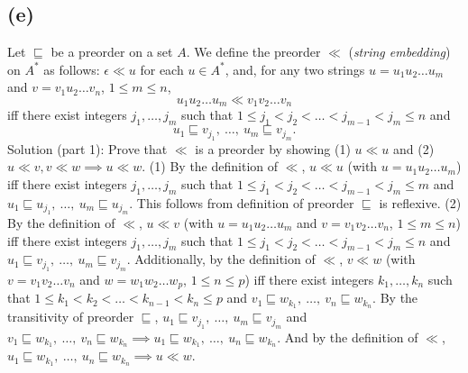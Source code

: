 \documentclass[12pt]{article}
\begin{document}
\subsection*{(e)}
Let $\sqsubseteq$ be a preorder on a set $A$. We define the
preorder $\ll$ ({\it string embedding\/}) on $A^{*}$ as follows:
\newline
$\epsilon \ll u$ for each $u\in A^{*}$, and,
for any two strings $u=u_{1}u_{2}\ldots u_{m}$ and
$v=v_{1}u_{2}\ldots v_{n}$, $1\leq m\leq n$,
$$u_{1}u_{2}\ldots u_{m} \ll v_{1}v_{2}\ldots v_{n}$$
iff there exist  integers $j_{1},\ldots,j_{m}$ such that
$1\leq j_{1} < j_{2} < \ldots < j_{m-1} < j_{m} \leq n$ and
$$u_{1} \sqsubseteq v_{j_{1}},\ \ldots,\ u_{m} \sqsubseteq v_{j_{m}}.$$
\newline
Solution (part 1): Prove that $\ll$ is a preorder by showing (1) $u \ll u$ and
(2) $u \ll v, v \ll w \implies u \ll w$.
\newline
(1) By the definition of $\ll$, $u \ll u$ (with $u=u_{1}u_{2}\ldots u_{m}$) iff
there exist integers $j_{1},\ldots,j_{m}$ such that
$1\leq j_{1} < j_{2} < \ldots < j_{m-1} < j_{m} \leq m$ and
$u_{1} \sqsubseteq u_{j_{1}},\ \ldots,\ u_{m} \sqsubseteq u_{j_{m}}$.
This follows from definition of preorder $\sqsubseteq$ is reflexive.
\newline
(2) By the definition of $\ll$, $u \ll v$ (with $u=u_{1}u_{2}\ldots u_{m}$ and
$v=v_{1}v_{2}\ldots v_{n}$, $1\leq m\leq n$)
iff there exist integers $j_{1},\ldots,j_{m}$ such that
$1\leq j_{1} < j_{2} < \ldots < j_{m-1} < j_{m} \leq n$ and
$u_{1} \sqsubseteq v_{j_{1}},\ \ldots,\ u_{m} \sqsubseteq v_{j_{m}}.$
\newline
Additionally, by the definition of $\ll$, $v \ll w$
(with $v=v_{1}v_{2}\ldots v_{n}$ and $w=w_{1}w_{2}\ldots w_{p}$,
$1\leq n\leq p$) iff there exist integers $k_{1},\ldots,k_{n}$ such that
$1\leq k_{1} < k_{2} < \ldots < k_{n-1} < k_{n} \leq p$ and
$v_{1} \sqsubseteq w_{k_{1}},\ \ldots,\ v_{n} \sqsubseteq w_{k_{n}}$.
\newline
By the transitivity of preorder $\sqsubseteq
$, $u_{1} \sqsubseteq v_{j_{1}},\ \ldots,\ u_{m} \sqsubseteq v_{j_{m}}$
and $v_{1} \sqsubseteq w_{k_{1}},\ \ldots,\ v_{n} \sqsubseteq w_{k_{n}}
\implies u_{1} \sqsubseteq w_{k_{1}},\ \ldots,\ u_{n} \sqsubseteq w_{k_{n}}$.
And by the definition of $\ll$, $u_{1} \sqsubseteq w_{k_{1}},\ \ldots,\ u_{n}
\sqsubseteq w_{k_{n}} \implies u \ll w$.

\medskip
\end{document}
